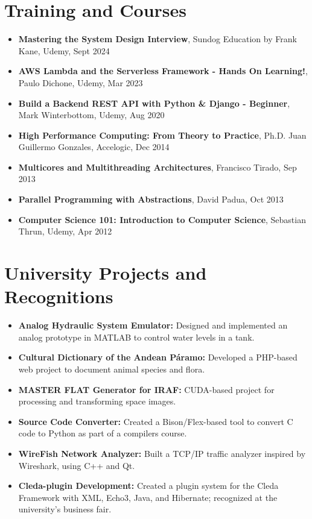 \documentclass[a4paper,10pt]{article}
\begin{document}
\section*{Training and Courses}
\sectionline
\begin{itemize}[leftmargin=0.5cm, topsep=0pt, parsep=0pt, itemsep=2pt]
	\item \textbf{Mastering the System Design Interview}, Sundog Education by Frank
	      Kane, Udemy, Sept 2024
	\item \textbf{AWS Lambda and the Serverless Framework - Hands On Learning!},
	      Paulo Dichone, Udemy, Mar 2023
	\item \textbf{Build a Backend REST API with Python \& Django - Beginner},
	      Mark Winterbottom, Udemy, Aug 2020
	\item \textbf{High Performance Computing: From Theory to Practice},
	      Ph.D. Juan Guillermo Gonzales, Accelogic, Dec 2014
	\item \textbf{Multicores and Multithreading Architectures}, Francisco Tirado,
	      Sep 2013
	\item \textbf{Parallel Programming with Abstractions}, David Padua, Oct 2013
	\item \textbf{Computer Science 101: Introduction to Computer Science},
	      Sebastian Thrun, Udemy, Apr 2012
\end{itemize}

\section*{University Projects and Recognitions}
\sectionline
\begin{itemize}[leftmargin=0.5cm, topsep=0pt, parsep=0pt, itemsep=2pt]
	\item \textbf{Analog Hydraulic System Emulator:} Designed and implemented an
	      analog prototype in MATLAB to control water levels in a tank.
	\item \textbf{Cultural Dictionary of the Andean Páramo:} Developed a PHP-based
	      web project to document animal species and flora.
	\item \textbf{MASTER FLAT Generator for IRAF:} CUDA-based project for processing
	      and transforming space images.
	\item \textbf{Source Code Converter:} Created a Bison/Flex-based tool to convert
	      C code to Python as part of a compilers course.
	\item \textbf{WireFish Network Analyzer:} Built a TCP/IP traffic analyzer
	      inspired by Wireshark, using C++ and Qt.
	\item \textbf{Cleda-plugin Development:} Created a plugin system for the Cleda
	      Framework with XML, Echo3, Java, and Hibernate; recognized at the
	      university's business fair.
\end{itemize}
\end{document}
